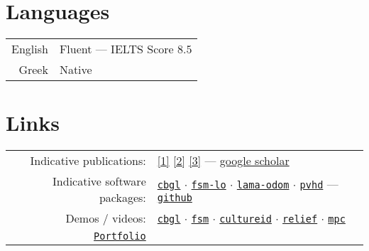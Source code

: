 \documentclass[a4paper,10pt,twoside]{article}
\begin{document}

\section{Languages}

\begin{tabular}{rp{12cm}}
English & Fluent --- IELTS Score $8.5$ \\
Greek & Native \\
\end{tabular}


\section{Links}

\begin{tabular}{rp{12cm}}
  Indicative publications: &
\href{https://ieeexplore.ieee.org/abstract/document/9981228}{[1]}
\href{https://www.sciencedirect.com/science/article/abs/pii/S0921889021002323}{[2]}
\href{https://www.tandfonline.com/doi/full/10.1080/00207179.2018.1514129}{[3]} --- \href{https://scholar.google.com/citations?view\_op=list\_works\&hl=en\&user=9\_hI4hMAAAAJ}{google scholar}\\

  Indicative software packages: &
\href{https://github.com/li9i/cbgl}{\texttt{cbgl}} $\cdot$
\href{https://github.com/li9i/fsm-lo}{\texttt{fsm-lo}} $\cdot$
\href{https://github.com/li9i/lama-odom}{\texttt{lama-odom}} $\cdot$
\href{https://github.com/li9i/pandora\_vision\_2014/tree/hydro-devel/pandora\_vision\_hole\_detector}{\texttt{pvhd}} --- \href{https://github.com/li9i}{\texttt{github}}\\

  Demos / videos: & \href{https://www.youtube.com/watch?v=xaDKjI0WkDc}{\texttt{cbgl}} $\cdot$ \href{https://www.youtube.com/watch?v=hB4qsHCEXGI}{\texttt{fsm}} $\cdot$ \href{https://cultureid.web.auth.gr/?page\_id=200&lang=en}{\texttt{cultureid}} $\cdot$ \href{https://relief.web.auth.gr/}{\texttt{relief}} $\cdot$ \href{https://www.youtube.com/watch?v=937OZez1iN8}{\texttt{mpc}}\\

  \href{https://raw.githubusercontent.com/li9i/portfolio/master/portfolio.pdf}{\texttt{Portfolio}} &
\end{tabular}
\end{document}

